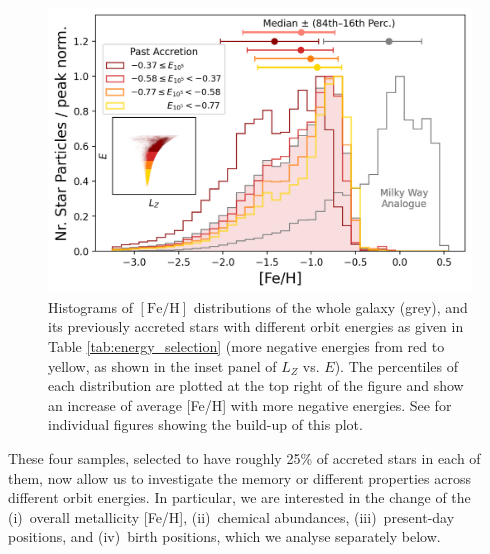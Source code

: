 \documentclass[fleqn,usenatbib]{mnras}
\begin{document}
\begin{figure}
    \centering
    \includegraphics[width=0.95\columnwidth]{figures/fe_h_histograms.png}
    \caption{Histograms of ${\mathrm{[Fe/H]}}$ distributions of the whole galaxy (grey), and its previously accreted stars with different orbit energies as given in Table \ref{tab:energy_selection} (more negative energies from red to yellow, as shown in the inset panel of $L_Z$ vs. $E$). The percentiles of each distribution are plotted at the top right of the figure and show an increase of average [Fe/H] with more negative energies. See \href{https://github.com/svenbuder/gse_nihaouhd/tree/main/figures}{\faGithub} for individual figures showing the build-up of this plot.}
    \label{fig:fe_h_histograms}
\end{figure}

These four samples, selected to have roughly 25\% of accreted stars in each of them, now allow us to investigate the memory or different properties across different orbit energies. In particular, we are interested in the change of the (i)~overall metallicity [Fe/H], (ii)~chemical abundances, (iii)~present-day positions, and (iv)~birth positions, which we analyse separately below.
\end{document}
